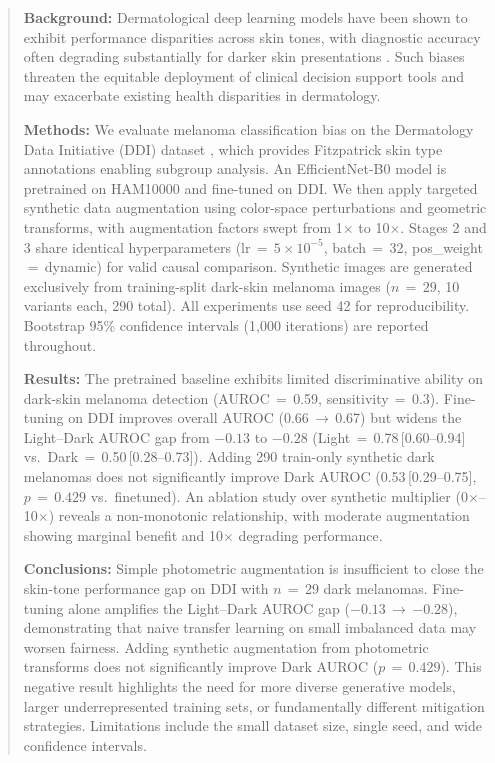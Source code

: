 \begin{abstract}
\textbf{Background:} Dermatological deep learning models have been shown to exhibit performance disparities across skin tones, with diagnostic accuracy often degrading substantially for darker skin presentations \cite{Daneshjou2022}. Such biases threaten the equitable deployment of clinical decision support tools and may exacerbate existing health disparities in dermatology.

\textbf{Methods:} We evaluate melanoma classification bias on the Dermatology Data Initiative (DDI) dataset \cite{Tschandl2018}, which provides Fitzpatrick skin type annotations \cite{Fitzpatrick1988} enabling subgroup analysis. An EfficientNet-B0 model is pretrained on HAM10000 and fine-tuned on DDI. We then apply targeted synthetic data augmentation using color-space perturbations and geometric transforms, with augmentation factors swept from 1$\times$ to 10$\times$. Stages 2 and 3 share identical hyperparameters (lr\,$=$\,$5{\times}10^{-5}$, batch\,$=$\,32, pos\_weight\,$=$\,dynamic) for valid causal comparison. Synthetic images are generated exclusively from training-split dark-skin melanoma images ($n\,{=}\,29$, 10 variants each, 290 total). All experiments use seed 42 for reproducibility. Bootstrap 95\% confidence intervals (1{,}000 iterations) are reported throughout.

\textbf{Results:} The pretrained baseline exhibits limited discriminative ability on dark-skin melanoma detection (AUROC\,$=$\,0.59, sensitivity\,$=$\,0.3). Fine-tuning on DDI improves overall AUROC (0.66\,$\rightarrow$\,0.67) but widens the Light--Dark AUROC gap from $-0.13$ to $-0.28$ (Light\,$=$\,0.78\,[0.60--0.94] vs.\ Dark\,$=$\,0.50\,[0.28--0.73]). Adding 290 train-only synthetic dark melanomas does not significantly improve Dark AUROC (0.53\,[0.29--0.75], $p\,{=}\,0.429$ vs.\ finetuned). An ablation study over synthetic multiplier (0$\times$--10$\times$) reveals a non-monotonic relationship, with moderate augmentation showing marginal benefit and 10$\times$ degrading performance.

\textbf{Conclusions:} Simple photometric augmentation is insufficient to close the skin-tone performance gap on DDI with $n\,{=}\,29$ dark melanomas. Fine-tuning alone amplifies the Light--Dark AUROC gap ($-0.13$\,$\rightarrow$\,$-0.28$), demonstrating that naive transfer learning on small imbalanced data may worsen fairness. Adding synthetic augmentation from photometric transforms does not significantly improve Dark AUROC ($p\,{=}\,0.429$). This negative result highlights the need for more diverse generative models, larger underrepresented training sets, or fundamentally different mitigation strategies. Limitations include the small dataset size, single seed, and wide confidence intervals.
\end{abstract}
